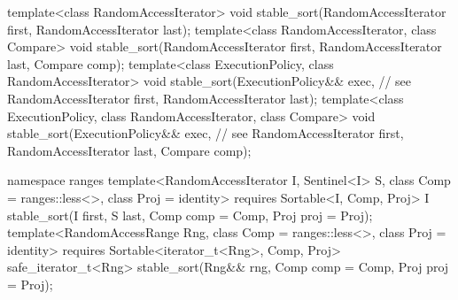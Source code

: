 \begin{codeblock}
  template<class RandomAccessIterator>
    void stable_sort(RandomAccessIterator first, RandomAccessIterator last);
  template<class RandomAccessIterator, class Compare>
    void stable_sort(RandomAccessIterator first, RandomAccessIterator last,
                     Compare comp);
  template<class ExecutionPolicy, class RandomAccessIterator>
    void stable_sort(ExecutionPolicy&& exec, // see 
                     RandomAccessIterator first, RandomAccessIterator last);
  template<class ExecutionPolicy, class RandomAccessIterator, class Compare>
    void stable_sort(ExecutionPolicy&& exec, // see 
                     RandomAccessIterator first, RandomAccessIterator last,
                     Compare comp);
\end{codeblock}\begin{addedblock}\begin{codeblock}
  namespace ranges {
    template<RandomAccessIterator I, Sentinel<I> S, class Comp = ranges::less<>,
        class Proj = identity>
      requires Sortable<I, Comp, Proj>
      I stable_sort(I first, S last, Comp comp = Comp{}, Proj proj = Proj{});
    template<RandomAccessRange Rng, class Comp = ranges::less<>, class Proj = identity>
      requires Sortable<iterator_t<Rng>, Comp, Proj>
      safe_iterator_t<Rng>
        stable_sort(Rng&& rng, Comp comp = Comp{}, Proj proj = Proj{});
  }
\end{codeblock}\end{addedblock}\begin{codeblock}


\end{codeblock}
